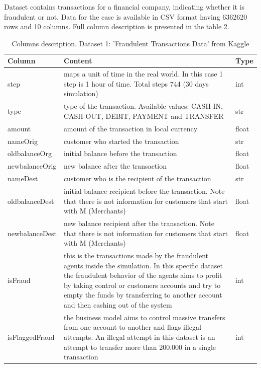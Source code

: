 \documentclass[12pt,a4paper, hidelinks]{article}
\begin{document}
Dataset contains transactions for a financial company, indicating whether it is fraudulent or not. Data for the case is available in CSV format having 6362620 rows and 10 columns. Full column description is presented in the table 2.

\begin{table}[ht!]
\centering
\begin{tabular}{|p{4cm}|p{10cm}|p{2cm}|}
\hline
\textbf{Column} & \textbf{Content} & \textbf{Type} \\
\hline
step & maps a unit of time in the real world. In this case 1 step is 1 hour of time. Total steps 744 (30 days simulation) & int \\
\hline
type & type of the transaction. Available values: CASH-IN, CASH-OUT, DEBIT, PAYMENT and TRANSFER & str \\
\hline
amount & amount of the transaction in local currency & float \\
\hline
nameOrig & customer who started the transaction & str \\
\hline
oldbalanceOrg & initial balance before the transaction & float \\
\hline
newbalanceOrig & new balance after the transaction & float \\
\hline
nameDest & customer who is the recipient of the transaction & str \\
\hline
oldbalanceDest & initial balance recipient before the transaction. Note that there is not information for customers that start with M (Merchants) & float \\
\hline
newbalanceDest & new balance recipient after the transaction. Note that there is not information for customers that start with M (Merchants) & float \\
\hline
isFraud & this is the transactions made by the fraudulent agents inside the simulation. In this specific dataset the fraudulent behavior of the agents aims to profit by taking control or customers accounts and try to empty the funds by transferring to another account and then cashing out of the system & int \\
\hline
isFlaggedFraud & the business model aims to control massive transfers from one account to another and flags illegal attempts. An illegal attempt in this dataset is an attempt to transfer more than 200.000 in a single transaction & int \\
\hline
\end{tabular}
\caption{Columns description. Dataset 1: 'Fraudulent Transactions Data' from Kaggle}
\end{table}
\end{document}
